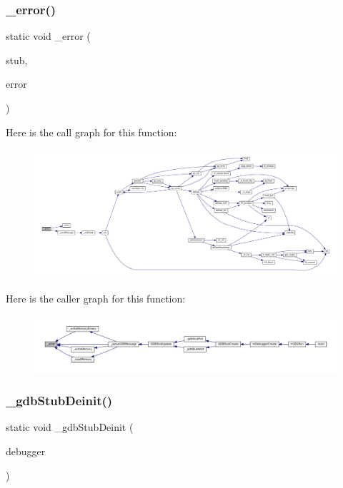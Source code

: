 \subsubsection{\texorpdfstring{\+\_\+error()}{\_error()}}
{\footnotesize\ttfamily static void \+\_\+error (\begin{DoxyParamCaption}\item[{struct G\+D\+B\+Stub $\ast$}]{stub,  }\item[{enum \mbox{\hyperlink{gdb-stub_8c_a5bd3541bce743d620bce1273a43416dd}{G\+D\+B\+Error}}}]{error }\end{DoxyParamCaption})\hspace{0.3cm}{\ttfamily [static]}}

Here is the call graph for this function\+:
\nopagebreak
\begin{figure}[H]
\begin{center}
\leavevmode
\includegraphics[width=350pt]{gdb-stub_8c_a2efa3a2574e849468b6c893d8fae58ca_cgraph}
\end{center}
\end{figure}
Here is the caller graph for this function\+:
\nopagebreak
\begin{figure}[H]
\begin{center}
\leavevmode
\includegraphics[width=350pt]{gdb-stub_8c_a2efa3a2574e849468b6c893d8fae58ca_icgraph}
\end{center}
\end{figure}
\mbox{\label{gdb-stub_8c_aff57f00e254220e5733ab7a534ab526c}} 
\subsubsection{\texorpdfstring{\+\_\+gdb\+Stub\+Deinit()}{\_gdbStubDeinit()}}
{\footnotesize\ttfamily static void \+\_\+gdb\+Stub\+Deinit (\begin{DoxyParamCaption}\item[{struct m\+Debugger $\ast$}]{debugger }\end{DoxyParamCaption})\hspace{0.3cm}{\ttfamily [static]}}

